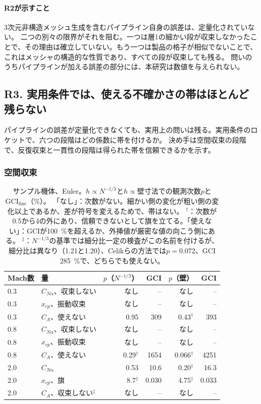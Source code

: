 \documentclass[twocolumn]{labreport}
\newcommand{\CNa}{C_{N\alpha}}
\newcommand{\fine}{\mathrm{fine}}
\begin{document}
\paragraph{R2が示すこと}
3次元非構造メッシュ生成を含むパイプライン自身の誤差は、定量化されていない。
二つの別々の限界がそれを阻む。一つは層1の細かい段が収束しなかったことで、その理由は確立していない。もう一つは製品の格子が相似でないことで、これはメッシャの構造的な性質であり、すべての段が収束しても残る。
問いのうちパイプラインが加える誤差の部分には、本研究は数値を与えられない。

\subsection{R3. 実用条件では、使える不確かさの帯はほとんど残らない}
\label{sec:r3}

パイプラインの誤差が定量化できなくても、実用上の問いは残る。実用条件のロケットで、六つの段階はどの係数に帯を付けるか。
決め手は空間収束の段階で、反復収束と一貫性の段階は得られた帯を信頼できるかを示す。

\subsubsection{空間収束}
\label{sec:grid}

\begin{table}[t]
\centering
\caption{サンプル機体、Euler。$h\propto N^{-1/3}$と$h\propto$壁寸法での観測次数$p$と$\mathrm{GCI}_\fine$（\%）。
「なし」：次数がない。細かい側の変化が粗い側の変化以上であるか、差が符号を変えるためで、帯はない。
$^\dagger$：次数が0.5から4の外にあり、信頼できないとして旗を立てる。「使えない」：GCIが100~\%を超えるか、外挿値が厳密な値の向こう側にある。
$^\ddagger$：$N^{-1/3}$の基準では細分比一定の検査がこの名前を付けるが、細分比は異なり（1.21と1.20）、Celikらの方法では$p=0.072$、GCI 285~\%で、どちらでも使えない。}
\label{tab:sample}
\small
\setlength{\tabcolsep}{2.4pt}
\begin{tabular}{@{}llrrrr@{}}
\toprule
Mach数 & 量 & $p$（$N^{-1/3}$） & GCI & $p$（壁） & GCI \\
\midrule
0.3 & $\CNa$、収束しない & なし & -- & なし & -- \\
0.3 & $x_{cp}$、振動収束 & なし & -- & なし & -- \\
0.3 & $C_A$、使えない & 0.95 & 309 & 0.43$^\dagger$ & 393 \\
0.8 & $\CNa$、収束しない & なし & -- & なし & -- \\
0.8 & $x_{cp}$、振動収束 & なし & -- & なし & -- \\
0.8 & $C_A$、使えない & 0.29$^\dagger$ & 1654 & 0.066$^\dagger$ & 4251 \\
2.0 & $\CNa$ & 0.53 & 10.6 & 0.20$^\dagger$ & 16.3 \\
2.0 & $x_{cp}$、旗 & 8.7$^\dagger$ & 0.030 & 4.75$^\dagger$ & 0.033 \\
2.0 & $C_A$、収束しない$^\ddagger$ & なし & -- & なし & -- \\
\bottomrule
\end{tabular}
\end{table}
\end{document}
